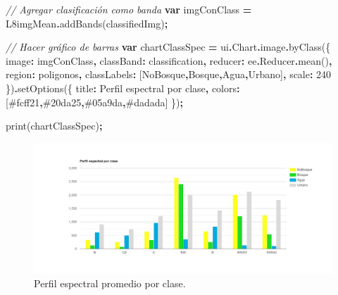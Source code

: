 \documentclass[
  12pt,
  letterpaper,
  twoside]{book}
\newenvironment{Shaded}{\begin{snugshade}}{\end{snugshade}}
\newcommand{\AttributeTok}[1]{\textcolor[rgb]{0.77,0.63,0.00}{#1}}
\newcommand{\CommentTok}[1]{\textcolor[rgb]{0.56,0.35,0.01}{\textit{#1}}}
\newcommand{\DataTypeTok}[1]{\textcolor[rgb]{0.13,0.29,0.53}{#1}}
\newcommand{\DecValTok}[1]{\textcolor[rgb]{0.00,0.00,0.81}{#1}}
\newcommand{\FunctionTok}[1]{\textcolor[rgb]{0.00,0.00,0.00}{#1}}
\newcommand{\KeywordTok}[1]{\textcolor[rgb]{0.13,0.29,0.53}{\textbf{#1}}}
\newcommand{\NormalTok}[1]{#1}
\newcommand{\OperatorTok}[1]{\textcolor[rgb]{0.81,0.36,0.00}{\textbf{#1}}}
\newcommand{\StringTok}[1]{\textcolor[rgb]{0.31,0.60,0.02}{#1}}
\begin{document}
\begin{Shaded}
\begin{Highlighting}[]
\CommentTok{// Agregar clasificación como banda}
\KeywordTok{var}\NormalTok{ imgConClass }\OperatorTok{=}\NormalTok{ L8imgMean}\OperatorTok{.}\FunctionTok{addBands}\NormalTok{(classifiedImg)}\OperatorTok{;}

\CommentTok{// Hacer gráfico de barras}
\KeywordTok{var}\NormalTok{ chartClassSpec }\OperatorTok{=}\NormalTok{ ui}\OperatorTok{.}\AttributeTok{Chart}\OperatorTok{.}\AttributeTok{image}\OperatorTok{.}\FunctionTok{byClass}\NormalTok{(\{}
  \DataTypeTok{image}\OperatorTok{:}\NormalTok{ imgConClass}\OperatorTok{,}
  \DataTypeTok{classBand}\OperatorTok{:} \StringTok{\textquotesingle{}classification\textquotesingle{}}\OperatorTok{,}
  \DataTypeTok{reducer}\OperatorTok{:}\NormalTok{ ee}\OperatorTok{.}\AttributeTok{Reducer}\OperatorTok{.}\FunctionTok{mean}\NormalTok{()}\OperatorTok{,}
  \DataTypeTok{region}\OperatorTok{:}\NormalTok{ poligonos}\OperatorTok{,}
  \DataTypeTok{classLabels}\OperatorTok{:}\NormalTok{ [}\StringTok{\textquotesingle{}NoBosque\textquotesingle{}}\OperatorTok{,}\StringTok{\textquotesingle{}Bosque\textquotesingle{}}\OperatorTok{,}\StringTok{\textquotesingle{}Agua\textquotesingle{}}\OperatorTok{,}\StringTok{\textquotesingle{}Urbano\textquotesingle{}}\NormalTok{]}\OperatorTok{,}
  \DataTypeTok{scale}\OperatorTok{:} \DecValTok{240}
\NormalTok{\})}\OperatorTok{.}\FunctionTok{setOptions}\NormalTok{(\{}
  \DataTypeTok{title}\OperatorTok{:} \StringTok{\textquotesingle{}Perfil espectral por clase\textquotesingle{}}\OperatorTok{,}
  \DataTypeTok{colors}\OperatorTok{:}\NormalTok{ [}\StringTok{\textquotesingle{}\#fcff21\textquotesingle{}}\OperatorTok{,}\StringTok{\textquotesingle{}\#20da25\textquotesingle{}}\OperatorTok{,}\StringTok{\textquotesingle{}\#05a9da\textquotesingle{}}\OperatorTok{,}\StringTok{\textquotesingle{}\#dadada\textquotesingle{}}\NormalTok{]}
\NormalTok{\})}\OperatorTok{;}

\FunctionTok{print}\NormalTok{(chartClassSpec)}\OperatorTok{;}
\end{Highlighting}
\end{Shaded}

\begin{figure}[btp]

{\centering \includegraphics[width=1\linewidth]{Img/SpectralSignClass} 

}

\caption{Perfil espectral promedio por clase.}\label{fig:unnamed-chunk-195}
\end{figure}
\end{document}
